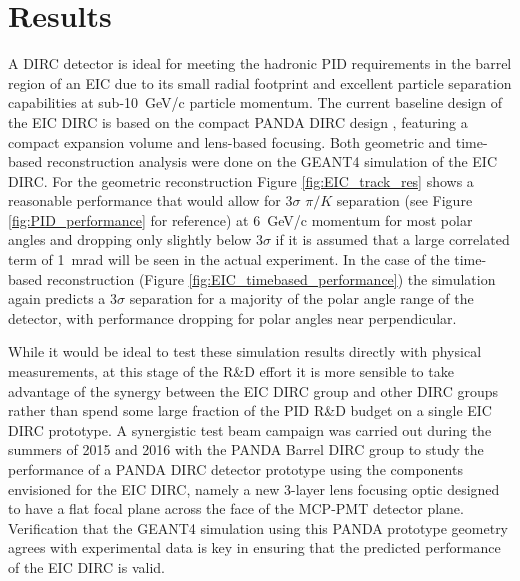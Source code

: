 \label{ch:summary}

\section{Results}
A DIRC detector is ideal for meeting the hadronic PID requirements in the barrel region of an EIC due to its small radial footprint and excellent particle separation capabilities at sub-10~GeV/c particle momentum. The current baseline design of the EIC DIRC is based on the compact PANDA DIRC design \cite{PANDA_barrel}, featuring a compact expansion volume and lens-based focusing. Both geometric and time-based reconstruction analysis were done on the GEANT4 simulation of the EIC DIRC. For the geometric reconstruction Figure \ref{fig:EIC_track_res} shows a reasonable performance that would allow for $3\sigma$ $\pi/K$ separation (see Figure \ref{fig:PID_performance} for reference) at 6~GeV/c momentum for most polar angles and dropping only slightly below $3\sigma$ if it is assumed that a large correlated term of 1~mrad will be seen in the actual experiment. In the case of the time-based reconstruction (Figure \ref{fig:EIC_timebased_performance}) the simulation again predicts a $3\sigma$ separation for a majority of the polar angle range of the detector, with performance dropping for polar angles near perpendicular.

While it would be ideal to test these simulation results directly with physical measurements, at this stage of the R\&D effort it is more sensible to take advantage of the synergy between the EIC DIRC group and other DIRC groups rather than spend some large fraction of the PID R\&D budget on a single EIC DIRC prototype. A synergistic test beam campaign was carried out during the summers of 2015 and 2016 with the PANDA Barrel DIRC group to study the performance of a PANDA DIRC detector prototype using the components envisioned for the EIC DIRC, namely a new 3-layer lens focusing optic designed to have a flat focal plane across the face of the MCP-PMT detector plane. Verification that the GEANT4 simulation using this PANDA prototype geometry agrees with experimental data is key in ensuring that the predicted performance of the EIC DIRC is valid.


